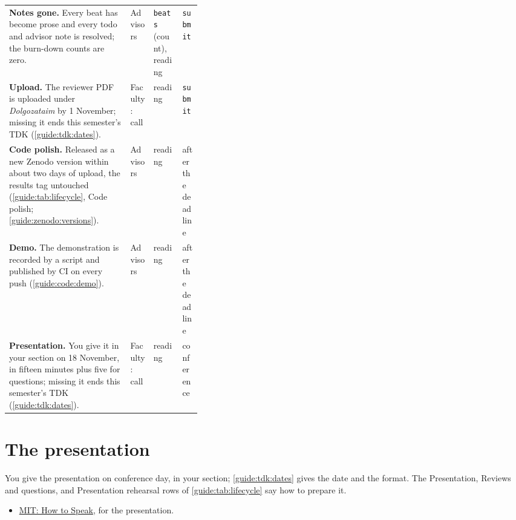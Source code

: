 {\begin{xltabular}{\linewidth}{X >{\raggedright\arraybackslash}p{0.12\linewidth} >{\raggedright\arraybackslash}p{0.15\linewidth} >{\raggedright\arraybackslash}p{0.1\linewidth}}
  \textbf{Notes gone.} Every beat has become prose and every todo and advisor note is resolved; the burn-down counts are zero. & Advisors & \texttt{beats} (count), reading & \texttt{submit} \\
  \textbf{Upload.} The reviewer PDF is uploaded under \emph{Dolgozataim} by 1 November; missing it ends this semester's TDK (\cref{guide:tdk:dates}). & Faculty: call & reading & \texttt{submit} \\
  \textbf{Code polish.} Released as a new Zenodo version within about two days of upload, the results tag untouched (\cref{guide:tab:lifecycle}, Code polish; \cref{guide:zenodo:versions}). & Advisors & reading & after the deadline \\
  \textbf{Demo.} The demonstration is recorded by a script and published by CI on every push (\cref{guide:code:demo}). & Advisors & reading & after the deadline \\
  \textbf{Presentation.} You give it in your section on 18 November, in fifteen minutes plus five for questions; missing it ends this semester's TDK (\cref{guide:tdk:dates}). & Faculty: call & reading & conference \\
\end{xltabular}
}

\section{The presentation}\label{guide:lifecycle:presentation}
You give the presentation on conference day, in your section; \cref{guide:tdk:dates} gives the date and the format. The Presentation, Reviews and questions, and Presentation rehearsal rows of \cref{guide:tab:lifecycle} say how to prepare it.
\begin{itemize}
  \item \href{https://www.youtube.com/watch?v=Unzc731iCUY}{MIT: How to Speak}, for the presentation.
\end{itemize}
